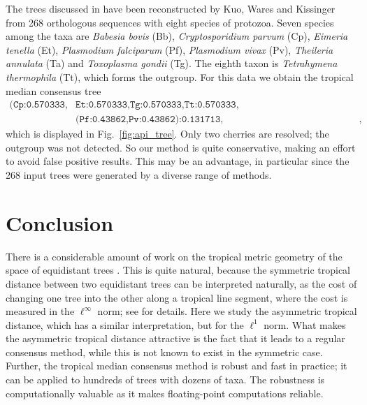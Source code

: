 \documentclass[a4paper,12pt]{amsart}
\theoremstyle{remark}
\begin{document}
The trees discussed in \cite[\S6.2]{Page+Yoshida+Zhang:2020} have been reconstructed by Kuo, Wares and Kissinger \cite{apicomplexa} from 268 orthologous sequences with eight species of protozoa.
Seven species among the taxa are \textit{Babesia bovis} (Bb), \textit{Cryptosporidium parvum} (Cp), \textit{Eimeria tenella} (Et), \textit{Plasmodium falciparum} (Pf), \textit{Plasmodium vivax} (Pv), \textit{Theileria annulata} (Ta) and \textit{Toxoplasma gondii} (Tg).
The eighth taxon is \textit{Tetrahymena thermophila} (Tt), which forms the outgroup.
For this data we obtain the tropical median consensus tree
\[
  \begin{split}
    \texttt{(Cp:0.570333,}&\texttt{Et:0.570333,Tg:0.570333,Tt:0.570333,}\\
    &\texttt{(Pf:0.43862,Pv:0.43862):0.131713,(Bb:0.57033,Ta:0.57033):0.000003)} \enspace ,
  \end{split}
\]
which is displayed in Fig.~\ref{fig:api_tree}.
Only two cherries are resolved; the outgroup was not detected.
So our method is quite conservative, making an effort to avoid false positive results.
This may be an advantage, in particular since the 268 input trees were generated by a diverse range of methods.



\section{Conclusion}
\noindent
There is a considerable amount of work on the tropical metric geometry of the space of equidistant trees \cite{ConvTreeSp,Lin-Yoshida:2018,YoshidaZhangZhang:2019,Page+Yoshida+Zhang:2020,Lin+Monod+Yoshida:2022}.
This is quite natural, because the symmetric tropical distance between two equidistant trees can be interpreted naturally, as the cost of changing one tree into the other along a tropical line segment, where the cost is measured in the $\ell^\infty$ norm; see \cite{Lin+Monod+Yoshida:2022} for details.
Here we study the asymmetric tropical distance, which has a similar interpretation, but for the $\ell^1$ norm.
What makes the asymmetric tropical distance attractive is the fact that it leads to a regular consensus method, while this is not known to exist in the symmetric case.
Further, the tropical median consensus method is robust and fast in practice; it can be applied to hundreds of trees with dozens of taxa.
The robustness is computationally valuable as it makes floating-point computations reliable.
\end{document}
